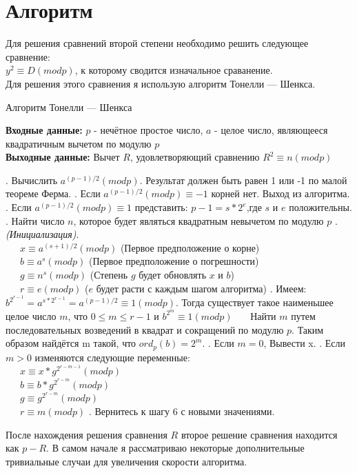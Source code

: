 \documentclass[11pt]{article}
\begin{document}
	\section{Алгоритм}
	Для решения сравнений второй степени необходимо решить следующее сравнение:\\
	$y^2\equiv D(modp)$, к которому сводится изначальное сраванение.\\
	Для решения этого сравнения я использую алгоритм Тонелли — Шенкса.
	\newpage
	\begin{algorithm}[ph]
		\caption{Алгоритм Тонелли — Шенкса}
		\label{alg:AlgName}
		\textbf{Входные данные:} $p$ - нечётное простое число, $a$ - целое число, являющееся квадратичным вычетом по модулю $p$\\
		\textbf{Выходные данные:} Вычет $R$, удовлетворяющий сравнению $R^2\equiv n(modp)$
		\begin{algorithmic}
			. Вычислить $a^{(p-1)/2}(modp)$. Результат должен быть равен 1 или -1 по малой теореме Ферма.
			. Если $a^{(p-1)/2}(modp) \equiv -1$ корней нет. Выход из алгоритма.
			. Если $a^{(p-1)/2}(modp) \equiv 1$ представить: $p-1=s*2^e$,где $s$ и $e$ положительны.
			. Найти число $n$, которое будет являться квадратным невычетом по модулю $p$
			. \textit{(Инициализация)}.\\ 
			\ \ \ $x\equiv a^{(s+1)/2}(modp)$ (Первое предположение о корне)\\
			\ \ \ $b\equiv a^s(modp)$ (Первое предположение о погрешности)\\
			\ \ \ $g\equiv n^s(modp)$ (Степень $g$ будет обновлять $x$ и $b$)\\
		    \ \ \ $r\equiv e(modp)$ ($e$ будет расти с каждым шагом алгоритма)
			. Имеем: $b^{2^{r-1}}=a^{s*2^{r-1}}=a^{(p-1)/2}\equiv 1(modp)$. Тогда существует такое наименьшее целое число $m$, что $0\le m\le r-1$ и $b^{2^m}\equiv1(modp)$
			\ \ \ Найти $m$ путем последовательных возведений в квадрат и сокращений по модулю $p$. Таким образом найдётся m такой, что $ord_p(b)=2^m$.
			. Если $m=0$, Вывести x.
			. Если $m>0$ изменяются следующие переменные: \\
			\ \ \ $x\equiv x*g^{2^{r-m-1}}(modp)$ \\
			\ \ \ $b\equiv b*g^{2^{r-m}}(modp)$ \\
			\ \ \ $g\equiv g^{2^{r-m}}(modp)$ \\
			\ \ \ $r\equiv m(modp)$
			. Вернитесь к шагу 6 с новыми значениями.
		\end{algorithmic}
	\end{algorithm}
	После нахождения решения сравнения $R$ второе решение сравнения находится как $p-R$. В самом начале я рассматриваю некоторые дополнительные тривиальные случаи для увеличения скорости алгоритма.
\end{document}
